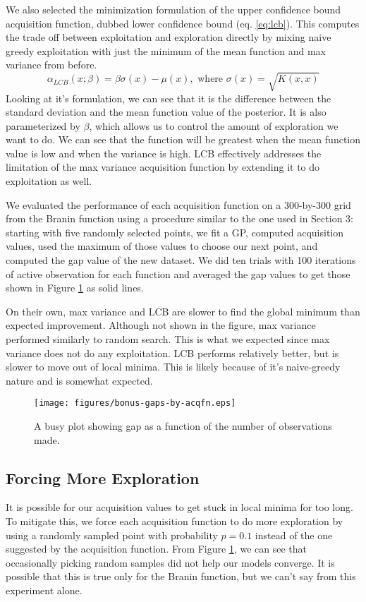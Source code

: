 \documentclass[11pt]{article}
\numberwithin{equation}{section}
\begin{document}
We also selected the minimization formulation of the upper confidence bound acquisition function, dubbed lower confidence bound (eq. \ref{eq:lcb}). This  computes the trade off between exploitation and exploration directly by mixing naive greedy exploitation with just the minimum of the mean function and max variance from before.
\begin{equation}
  \alpha_{LCB}(x; \beta) = \beta \sigma(x) - \mu(x), \text{ where } \sigma(x) = \sqrt{K(x, x)}
  \label{eq:lcb}
\end{equation}
Looking at it's formulation, we can see that it is the difference between the
standard deviation and the mean function value of the posterior. It is also
parameterized by $\beta$, which allows us to control the amount of
exploration we want to do. We can see that the function will be greatest when
the mean function value is low and when the variance is high. LCB effectively
addresses the limitation of the max variance acquisition function by
extending it to do exploitation as well.

We evaluated the performance of each acquisition function on a 300-by-300
grid from the Branin function using a procedure similar to the one used in
Section 3: starting with five randomly selected points, we fit a GP, computed
acquisition values, used the maximum of those values to choose our next
point, and computed the gap value of the new dataset. We did ten trials with
100 iterations of active observation for each function and averaged the gap
values to get those shown in Figure \ref{fig:bonus-gaps} as solid lines.

On their own, max variance and LCB are slower to find the global minimum than
expected improvement. Although not shown in the figure, max variance
performed similarly to random search. This is what we expected since max
variance does not do any exploitation. LCB performs relatively better, but is
slower to move out of local minima. This is likely because of it's
naive-greedy nature and is somewhat expected.

\begin{figure}[h]
  \centering
  \texttt{[image: figures/bonus-gaps-by-acqfn.eps]}
  \caption{A busy plot showing gap as a function of the number of
  observations made.}
  \label{fig:bonus-gaps}
\end{figure}

\subsection*{Forcing More Exploration}
It is possible for our acquisition values to get stuck in local minima for too long. To mitigate this, we force each acquisition function to do more exploration by using a randomly sampled point with probability $p = 0.1$ instead of the one suggested by the acquisition function. From Figure \ref{fig:bonus-gaps}, we can see that occasionally picking random samples did not help our models converge. It is possible that this is true only for the Branin function, but we can't say from this experiment alone.
\end{document}
